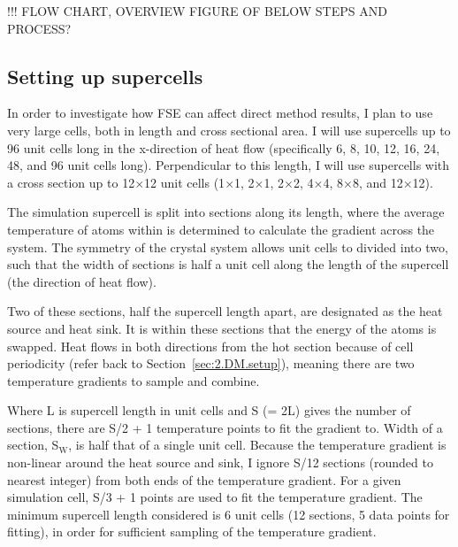!!! FLOW CHART, OVERVIEW FIGURE OF BELOW STEPS AND PROCESS?


\subsection{\label{sec:3.DM.cell}Setting up supercells}

In order to investigate how FSE can affect direct method results, I plan to use very large cells, both in length and cross sectional area. I will use supercells up to 96 unit cells long in the x-direction of heat flow (specifically 6, 8, 10, 12, 16, 24, 48, and 96 unit cells long). Perpendicular to this length, I will use supercells with a cross section up to 12$\times$12 unit cells (1$\times$1, 2$\times$1, 2$\times$2, 4$\times$4, 8$\times$8, and 12$\times$12).

The simulation supercell is split into sections along its length, where the average temperature of atoms within is determined to calculate the gradient across the system. The symmetry of the \bdgs crystal system allows unit cells to divided into two, such that the width of sections is half a unit cell along the length of the supercell (the direction of heat flow). 

Two of these sections, half the supercell length apart, are designated as the heat source and heat sink. It is within these sections that the energy of the atoms is swapped. Heat flows in both directions from the hot section because of cell periodicity (refer back to Section~\ref{sec:2.DM.setup}), meaning there are two temperature gradients to sample and combine. 

Where L is supercell length in unit cells and S (= 2L) gives the number of sections, there are S/2 + 1 temperature points to fit the gradient to. Width of a section, S$_{\mathrm{W}}$, is half that of a single unit cell. Because the temperature gradient is non-linear around the heat source and sink, I ignore S/12 sections (rounded to nearest integer) from both ends of the temperature gradient. For a given simulation cell, S/3 + 1 points are used to fit the temperature gradient. The minimum supercell length considered is 6 unit cells (12 sections, 5 data points for fitting), in order for sufficient sampling of the temperature gradient. 


